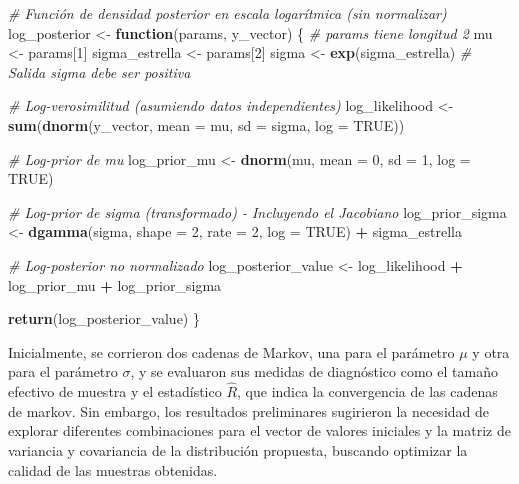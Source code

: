 \documentclass[
]{article}
\newenvironment{Shaded}{\begin{snugshade}}{\end{snugshade}}
\newcommand{\AttributeTok}[1]{\textcolor[rgb]{0.13,0.29,0.53}{#1}}
\newcommand{\CommentTok}[1]{\textcolor[rgb]{0.56,0.35,0.01}{\textit{#1}}}
\newcommand{\ConstantTok}[1]{\textcolor[rgb]{0.56,0.35,0.01}{#1}}
\newcommand{\ControlFlowTok}[1]{\textcolor[rgb]{0.13,0.29,0.53}{\textbf{#1}}}
\newcommand{\DecValTok}[1]{\textcolor[rgb]{0.00,0.00,0.81}{#1}}
\newcommand{\FunctionTok}[1]{\textcolor[rgb]{0.13,0.29,0.53}{\textbf{#1}}}
\newcommand{\NormalTok}[1]{#1}
\newcommand{\OtherTok}[1]{\textcolor[rgb]{0.56,0.35,0.01}{#1}}
\newcommand{\SpecialCharTok}[1]{\textcolor[rgb]{0.81,0.36,0.00}{\textbf{#1}}}
\begin{document}
\begin{Shaded}
\begin{Highlighting}[]
\CommentTok{\# Función de densidad posterior en escala logarítmica (sin normalizar)}
\NormalTok{log\_posterior }\OtherTok{\textless{}{-}} \ControlFlowTok{function}\NormalTok{(params, y\_vector) \{}
  \CommentTok{\# \textquotesingle{}params\textquotesingle{} tiene longitud 2}
\NormalTok{  mu }\OtherTok{\textless{}{-}}\NormalTok{ params[}\DecValTok{1}\NormalTok{]}
\NormalTok{  sigma\_estrella }\OtherTok{\textless{}{-}}\NormalTok{ params[}\DecValTok{2}\NormalTok{]}
\NormalTok{  sigma }\OtherTok{\textless{}{-}} \FunctionTok{exp}\NormalTok{(sigma\_estrella) }\CommentTok{\# Salida sigma debe ser positiva}

  \CommentTok{\# Log{-}verosimilitud (asumiendo datos independientes)}
\NormalTok{  log\_likelihood }\OtherTok{\textless{}{-}} \FunctionTok{sum}\NormalTok{(}\FunctionTok{dnorm}\NormalTok{(y\_vector, }\AttributeTok{mean =}\NormalTok{ mu, }\AttributeTok{sd =}\NormalTok{ sigma, }\AttributeTok{log =} \ConstantTok{TRUE}\NormalTok{))}

  \CommentTok{\# Log{-}prior de mu}
\NormalTok{  log\_prior\_mu }\OtherTok{\textless{}{-}} \FunctionTok{dnorm}\NormalTok{(mu, }\AttributeTok{mean =} \DecValTok{0}\NormalTok{, }\AttributeTok{sd =} \DecValTok{1}\NormalTok{, }\AttributeTok{log =} \ConstantTok{TRUE}\NormalTok{)}

  \CommentTok{\# Log{-}prior de sigma (transformado) {-} Incluyendo el Jacobiano}
\NormalTok{  log\_prior\_sigma }\OtherTok{\textless{}{-}} \FunctionTok{dgamma}\NormalTok{(sigma, }\AttributeTok{shape =} \DecValTok{2}\NormalTok{, }\AttributeTok{rate =} \DecValTok{2}\NormalTok{, }\AttributeTok{log =} \ConstantTok{TRUE}\NormalTok{) }\SpecialCharTok{+}\NormalTok{ sigma\_estrella}

  \CommentTok{\# Log{-}posterior no normalizado}
\NormalTok{  log\_posterior\_value }\OtherTok{\textless{}{-}}\NormalTok{ log\_likelihood }\SpecialCharTok{+}\NormalTok{ log\_prior\_mu }\SpecialCharTok{+}\NormalTok{ log\_prior\_sigma}

  \FunctionTok{return}\NormalTok{(log\_posterior\_value)}
\NormalTok{\}}
\end{Highlighting}
\end{Shaded}

Inicialmente, se corrieron dos cadenas de Markov, una para el parámetro \(\mu\) y otra para el parámetro \(\sigma\), y se evaluaron sus medidas de diagnóstico como el tamaño efectivo de muestra y el estadístico \(\hat{R}\), que indica la convergencia de las cadenas de markov. Sin embargo, los resultados preliminares sugirieron la necesidad de explorar diferentes combinaciones para el vector de valores iniciales y la matriz de variancia y covariancia de la distribución propuesta, buscando optimizar la calidad de las muestras obtenidas.
\end{document}
